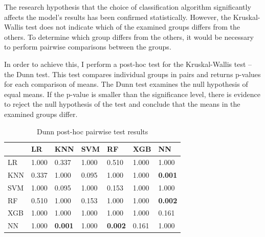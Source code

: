 The research hypothesis that the choice of classification algorithm significantly affects the model's results has been confirmed statistically.
However, the Kruskal-Wallis test does not indicate which of the examined groups differs from the others. To determine which group differs from the others, it would be necessary to perform pairwise comparisons between the groups. 

In order to achieve this, I perform a post-hoc test for the Kruskal-Wallis test -- the Dunn test. This test compares individual groups in pairs and returns p-values for each comparison of means. The Dunn test examines the null hypothesis of equal means. If the p-value is smaller than the significance level, there is evidence to reject the null hypothesis of the test and conclude that the means in the examined groups differ.


\begin{table}[htb]
\centering
{
\makegapedcells
\begin{tabular}{l|llllll}
    & LR    & KNN            & SVM   & RF             & XGB   & NN             \\ \hline
LR  & 1.000 & 0.337          & 1.000 & 0.510          & 1.000 & 1.000          \\ 
KNN & 0.337 & 1.000          & 0.095 & 1.000          & 1.000 & \textbf{0.001} \\ 
SVM & 1.000 & 0.095          & 1.000 & 0.153          & 1.000 & 1.000          \\
RF  & 0.510 & 1.000          & 0.153 & 1.000          & 1.000 & \textbf{0.002} \\
XGB & 1.000 & 1.000          & 1.000 & 1.000          & 1.000 & 0.161          \\
NN  & 1.000 & \textbf{0.001} & 1.000 & \textbf{0.002} & 0.161 & 1.000  
\end{tabular}
}
\caption{Dunn post-hoc pairwise test results}
\label{dunn_pairwise}
\end{table}

